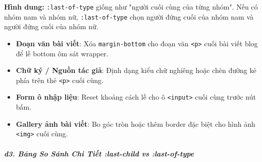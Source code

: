 \documentclass[11pt,oneside]{book}
\newcommand{\thd}[1]{\textcolor{white}{\textbf{\strut #1}}}
\newcommand{\codeinline}[1]{\textcolor{accentOrange}{\texttt{#1}}}
\begin{document}
\begin{tipBox}
\textbf{Hình dung:} \codeinline{:last-of-type} giống như "người cuối cùng của từng nhóm". Nếu có nhóm nam và nhóm nữ, \codeinline{:last-of-type} chọn người đứng cuối của nhóm nam và người đứng cuối của nhóm nữ.
\end{tipBox}

\begin{conceptBox}
\begin{itemize}[leftmargin=1.5em, itemsep=3pt, parsep=0pt]
    \item \textbf{Đoạn văn bài viết}: Xóa \codeinline{margin-bottom} cho đoạn văn \codeinline{<p>} cuối bài viết blog để lề bottom ôm sát wrapper.
    \item \textbf{Chữ ký / Nguồn tác giả}: Định dạng kiểu chữ nghiêng hoặc chèn đường kẻ phía trên thẻ \codeinline{<p>} cuối cùng.
    \item \textbf{Form ô nhập liệu}: Reset khoảng cách lề cho ô \codeinline{<input>} cuối cùng trước nút bấm.
    \item \textbf{Gallery ảnh bài viết}: Bo góc tròn hoặc thêm border đặc biệt cho hình ảnh \codeinline{<img>} cuối cùng.
\end{itemize}
\end{conceptBox}


\subparagraph{d3. Bảng So Sánh Chi Tiết :last-child vs :last-of-type}
\mbox{}\par\vspace{2pt}

\begin{prettyTableBox}
\sffamily\small
{}
\end{prettyTableBox}
\end{document}
